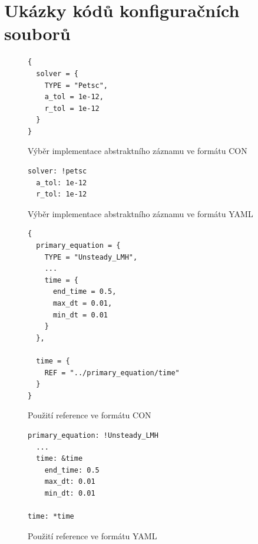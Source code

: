 \documentclass[FM,bw,DP]{tulthesis}
\begin{document}
\appendix



\chapter{Ukázky kódů konfiguračních souborů}

\lstset{style=code}

\begin{figure}[h]
\begin{lstlisting}
{
  solver = {
    TYPE = "Petsc",
    a_tol = 1e-12,
    r_tol = 1e-12
  }
}
\end{lstlisting}
\vspace*{-20pt}
\caption{Výběr implementace abstraktního záznamu ve formátu CON}
\label{img:abstract-record-con}
\end{figure}

\begin{figure}[h]
\begin{lstlisting}
solver: !petsc
  a_tol: 1e-12
  r_tol: 1e-12
\end{lstlisting}
\vspace*{-20pt}
\caption{Výběr implementace abstraktního záznamu ve formátu YAML}
\label{img:abstract-record-yaml}
\end{figure}

\clearpage

\begin{figure}[h]
\begin{lstlisting}
{
  primary_equation = {
    TYPE = "Unsteady_LMH",
    ...
    time = {
      end_time = 0.5, 
      max_dt = 0.01,
      min_dt = 0.01
    }
  },
  
  time = {
    REF = "../primary_equation/time"
  }
}
\end{lstlisting}
\vspace*{-20pt}
\caption{Použití reference ve formátu CON}
\label{img:reference-con}
\end{figure}

\begin{figure}[h]
\begin{lstlisting}
primary_equation: !Unsteady_LMH
  ...
  time: &time
    end_time: 0.5
    max_dt: 0.01
    min_dt: 0.01

time: *time
\end{lstlisting}
\vspace*{-20pt}
\caption{Použití reference ve formátu YAML}
\label{img:reference-yaml}
\end{figure}
\end{document}
